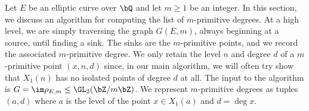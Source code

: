 \documentclass[11pt,reqno]{amsart}
\theoremstyle{plain}
\theoremstyle{definition}
\newcommand{\Q}{\bQ}
\newcommand{\Z}{\bZ}
\newcommand{\abbey}[1]{\textcolor{blue}{Abbey: #1}}
\newcommand{\abedit}[1]{{\color{blue} #1}}
\begin{document}
Let $E$ be an elliptic curve over $\Q$ and let $m\geq1$ be an integer. In this section, we discuss an algorithm for computing the list  of $m$-primitive degrees. At a high level, we are simply traversing the graph $G(E,m)$, always beginning at a source, until finding a sink. The sinks are the $m$-primitive points, and we record the associated $m$-primitive degree. We only retain the level $n$ and degree $d$ of a $m$-primitive point $(x,n,d)$ since, in our main algorithm, we will often try show that $X_1(n)$ has no isolated points of degree $d$ at all. The input to the algorithm is $G=\im \rho_{E,m}\leq \GL_2(\Z/m\Z)$. We represent $m$-primitive degrees as tuples $( a,d)$ where $a$ is the level of the point $x\in X_1(a)$ and $d=\deg x$.

\end{document}

